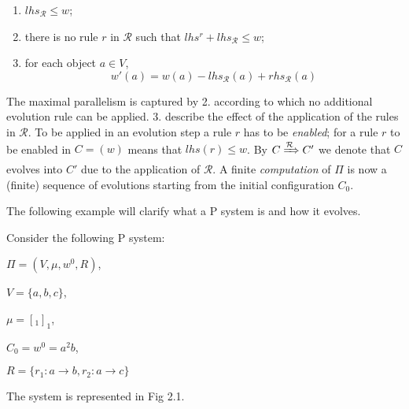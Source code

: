 \begin{enumerate}
    \item $lhs_\mathcal{R} \leq w$;
    \item there is no rule $r$ in $\mathcal{R}$ such that $lhs^r+lhs_\mathcal{R} \leq w$;
    \item for each object $a \in V$,
    \[ w'(a)=w(a)-lhs_\mathcal{R}(a)+rhs_\mathcal{R}(a)\]
\end{enumerate}

The maximal parallelism is captured by 2. according to which no additional evolution rule can be applied.
3. describe the effect of the application of the rules in $\mathcal{R}$.
To be applied in an evolution step a rule $r$ has to be \textit{enabled}; for a rule $r$ to be enabled in $C=(w)$ means that $lhs(r) \leq w$.
By $C \xRightarrow{\mathcal{R}} C'$ we denote that $C$ evolves into $C'$ due to the application of $\mathcal{R}$.
A finite \textit{computation} of $\Pi$ is now a (finite) sequence of evolutions starting from the initial configuration $C_0$.\newline

The following example will clarify what a P system is and how it evolves.
\begin{example}
\label{ex:flat_membrane}
Consider the following P system:
\begin{description}
   \item $\Pi=(V,\mu,w^0,R)$,
   \item $V=\{a,b,c\}$,
   \item $\mu=[_{1}]_{1}$,
   \item $C_0=w^0=a^2b$,
   \item $R=\{r_1:a \rightarrow b, r_2:a \rightarrow c\}$
\end{description}    
\end{example}

The system is represented in Fig 2.1.

\begin{figure}[h]
\centering


\caption{}
\label{}
\end{figure}

